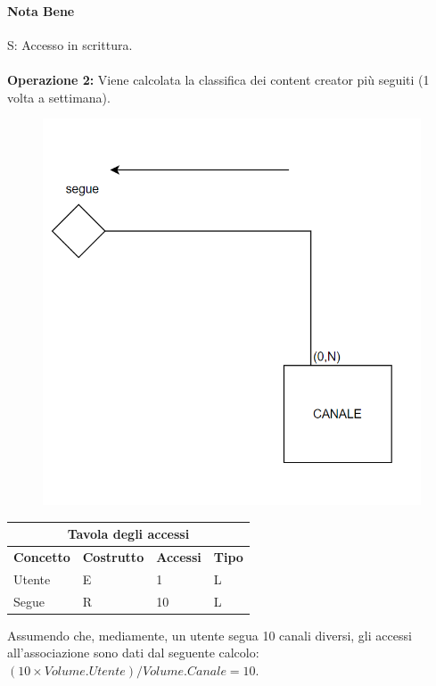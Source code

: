 \paragraph{Nota Bene} S: Accesso in scrittura. \\ \\
\newpage
\textbf{Operazione 2:} Viene calcolata la classifica dei content creator più seguiti (1 volta a settimana).
\begin{figure}[h]
    \centering
    \includegraphics[scale = 0.5]{img/ridondanza111.png}
\end{figure}
\begin{center}
\begin{tabular}{|p{3cm}|p{3cm}|p{3cm}|p{3cm}|}
\hline
\multicolumn{4}{|c|}{\textbf{Tavola degli accessi}}\\
\hline
 \multicolumn{1}{|c|}{\textbf{Concetto}} 
 & \multicolumn{1}{|c|}{\textbf{Costrutto}}
 & \multicolumn{1}{|c|}{\textbf{Accessi}}
 & \multicolumn{1}{|c|}{\textbf{Tipo}}\\
  \hline
  Utente & E & 1 & L\\
  \hline
  Segue & R & 10 & L\\
 \hline
\end{tabular}
\end{center}
Assumendo che, mediamente, un utente segua 10 canali diversi, gli accessi all'associazione sono dati dal seguente calcolo: $(10 \times Volume.Utente) / Volume.Canale = 10$.
